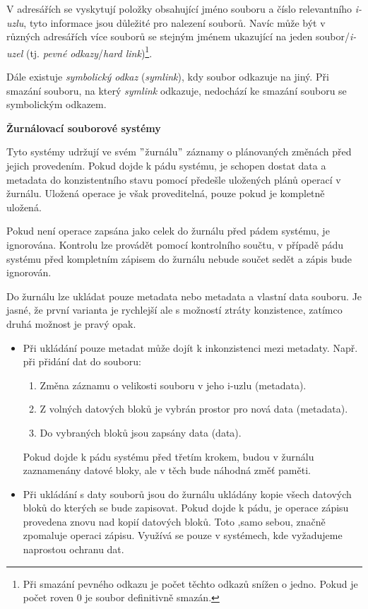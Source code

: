 V adresářích se vyskytují položky obsahující jméno souboru a číslo relevantního \textit{i-uzlu}, tyto informace jsou důležité pro nalezení souborů. Navíc může být v různých adresářích více souborů se stejným jménem ukazující na jeden soubor/\textit{i-uzel} (tj. \textit{pevné odkazy}/\textit{hard link})\footnote{Při smazání pevného odkazu je počet těchto odkazů snížen o jedno. Pokud je počet roven 0 je soubor definitivně smazán.}.

\vspace{0,5cm}

Dále existuje \textit{symbolický odkaz} (\textit{symlink}), kdy soubor odkazuje na jiný. Při smazání souboru, na který \textit{symlink} odkazuje, nedochází ke smazání souboru se symbolickým odkazem. 

\newpage

\begin{Large}
    \textbf{Žurnálovací souborové systémy}
\end{Large}

Tyto systémy udržují ve svém $"$žurnálu$"$ záznamy o plánovaných změnách před jejich provedením. Pokud dojde k pádu systému, je schopen dostat data a metadata do konzistentního stavu pomocí předešle uložených plánů operací v žurnálu. 
Uložená operace je však proveditelná, pouze pokud je kompletně uložená. 

\vspace{0,5cm}

Pokud není operace zapsána jako celek do žurnálu před pádem systému, je ignorována. Kontrolu lze provádět pomocí kontrolního součtu, v případě pádu systému před kompletním zápisem do žurnálu nebude součet sedět a zápis bude ignorován.

\vspace{0,5cm}

Do žurnálu lze ukládat pouze metadata nebo metadata a vlastní data souboru. Je jasné, že první varianta je rychlejší ale s možností ztráty konzistence, zatímco druhá možnost je pravý opak.

\begin{itemize}
    \item Při ukládání pouze metadat může dojít k inkonzistenci mezi metadaty. Např. při přidání dat do souboru:
    \begin{enumerate}
        \item Změna záznamu o velikosti souboru v jeho i-uzlu (metadata).
        \item Z volných datových bloků je vybrán prostor pro nová data (metadata).
        \item Do vybraných bloků jsou zapsány data (data). 
    \end{enumerate}
    Pokud dojde k pádu systému před třetím krokem, budou v žurnálu zaznamenány datové bloky, ale v těch bude náhodná změť paměti. 
    
    \item Při ukládání s daty souborů jsou do žurnálu ukládány kopie všech datových bloků do kterých se bude zapisovat. Pokud dojde k pádu, je operace zápisu provedena znovu nad kopií datových bloků. Toto ,samo sebou, značně zpomaluje operaci zápisu. Využívá se pouze v systémech, kde vyžadujeme naprostou ochranu dat. 
\end{itemize}

